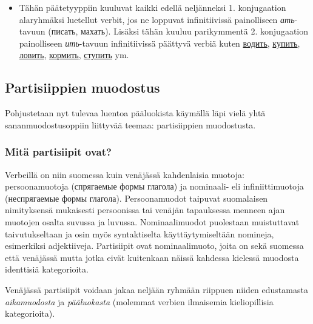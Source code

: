 \documentclass[]{scrartcl}
\providecommand{\tightlist}{%
  \setlength{\itemsep}{0pt}\setlength{\parskip}{0pt}}
\begin{document}
\begin{enumerate}
  \begin{itemize}
  \tightlist
  \item
    Tähän päätetyyppiin kuuluvat kaikki edellä neljänneksi 1.
    konjugaation alaryhmäksi luetellut verbit, jos ne loppuvat
    infinitiivissä painolliseen \emph{ать}-tavuun (писать, махать).
    Lisäksi tähän kuuluu parikymmentä 2. konjugaation painolliseen
    \emph{ить}-tavuun infinitiivissä päättyvä verbiä kuten
    \href{http://ru.wiktionary.org/wiki/\%D0\%B2\%D0\%BE\%D0\%B4\%D0\%B8\%D1\%82\%D1\%8C}{водить},
    \href{http://ru.wiktionary.org/wiki/\%D0\%BA\%D1\%83\%D0\%BF\%D0\%B8\%D1\%82\%D1\%8C}{купить},
    \href{http://ru.wiktionary.org/wiki/\%D0\%BB\%D0\%BE\%D0\%B2\%D0\%B8\%D1\%82\%D1\%8C}{ловить},
    \href{http://ru.wiktionary.org/wiki/\%D0\%BA\%D0\%BE\%D1\%80\%D0\%BC\%D0\%B8\%D1\%82\%D1\%8C}{кормить},
    \href{http://ru.wiktionary.org/wiki/\%D1\%81\%D1\%82\%D1\%83\%D0\%BF\%D0\%B8\%D1\%82\%D1\%8C}{ступить}
    ym.
  \end{itemize}
\end{enumerate}

\subsection{Partisiippien muodostus}\label{partisiippien-muodostus}

Pohjustetaan nyt tulevaa luentoa pääluokista käymällä läpi vielä yhtä
sananmuodostusoppiin liittyvää teemaa: partisiippien muodostusta.

\subsubsection{Mitä partisiipit ovat?}\label{mituxe4-partisiipit-ovat}

Verbeillä on niin suomessa kuin venäjässä kahdenlaisia muotoja:
persoonamuotoja (спрягаемые формы глагола) ja nominaali- eli
infiniittimuotoja (неспрягаемые формы глагола). Persoonamuodot taipuvat
suomalaisen nimityksensä mukaisesti persoonissa tai venäjän tapauksessa
menneen ajan muotojen osalta suvussa ja luvussa. Nominaalimuodot
puolestaan muistuttavat taivutukseltaan ja osin myös syntaktiselta
käyttäytymiseltään nomineja, esimerkiksi adjektiiveja. Partisiipit ovat
nominaalimuoto, joita on sekä suomessa että venäjässä mutta jotka eivät
kuitenkaan näissä kahdessa kielessä muodosta identtisiä kategorioita.

Venäjässä partisiipit voidaan jakaa neljään ryhmään riippuen niiden
edustamasta \emph{aikamuodosta} ja \emph{pääluokasta} (molemmat verbien
ilmaisemia kieliopillisia kategorioita).
\end{document}
